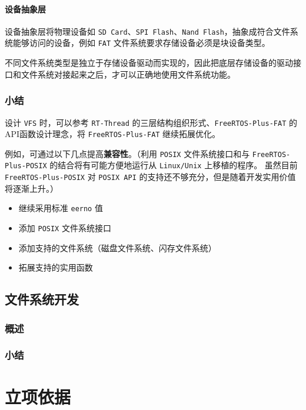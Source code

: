 \documentclass[UTF8,a4paper]{ctexart}
\begin{document}
\paragraph{设备抽象层}
设备抽象层将物理设备如 \texttt{SD Card}、\texttt{SPI Flash}、\texttt{Nand Flash}，抽象成符合文件系统能够访问的设备，例如 \texttt{FAT} 文件系统要求存储设备必须是块设备类型。

不同文件系统类型是独立于存储设备驱动而实现的，因此把底层存储设备的驱动接口和文件系统对接起来之后，才可以正确地使用文件系统功能。
\subsubsection{小结}
设计 \texttt{VFS} 时，可以参考 \texttt{RT-Thread} 的三层结构组织形式、\texttt{FreeRTOS-Plus-FAT} 的API函数设计理念，将 \texttt{FreeRTOS-Plus-FAT} 继续拓展优化。

例如，可通过以下几点提高\textbf{兼容性}。（利用 \texttt{POSIX} 文件系统接口和与 \texttt{FreeRTOS-Plus-POSIX} 的结合将有可能方便地运行从 \texttt{Linux/Unix} 上移植的程序。
虽然目前 \texttt{FreeRTOS-Plus-POSIX} 对 \texttt{POSIX API} 的支持还不够充分，但是随着开发实用价值将逐渐上升。）

\begin{itemize}
    \item 继续采用标准 \texttt{eerno} 值
    \item 添加 \texttt{POSIX} 文件系统接口
    \item 添加支持的文件系统（磁盘文件系统、闪存文件系统）
    \item 拓展支持的实用函数
\end{itemize}

\subsection{文件系统开发}
\subsubsection{概述}
\subsubsection{小结}

\section{立项依据}

\end{document}
